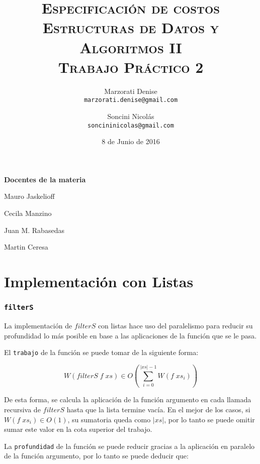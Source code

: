 \documentclass[a4paper,10pt]{article}
\author{
    Marzorati Denise \\
    \texttt{marzorati.denise@gmail.com}
    \and Soncini Nicolás \\
    \texttt{soncininicolas@gmail.com}
}
\date{
    8 de Junio de 2016
}
\title{
    \Huge \textsc{Especificación de costos} \\
    \large \textsc{Estructuras de Datos y Algoritmos II} \\
    \textsc{Trabajo Práctico 2}
}
\begin{document}
\bigskip
\bigskip
\bigskip

\maketitle

\thispagestyle{empty}

\begin{center}
\large \bf Docentes de la materia
\end{center}

\begin{center}
Mauro Jaskelioff

Cecila Manzino

Juan M. Rabasedas

Martin Ceresa
\end{center}

\newpage{}


\part*{Implementación con Listas}


\section*{\texttt{filterS}}

    La implementación de $filterS$ con listas hace uso del paralelismo para
reducir su profundidad lo más posible en base a las aplicaciones de la función 
que se le pasa.

    El \texttt{trabajo} de la función se puede tomar de la siguiente forma:

\begin{equation*}
    W \left(filterS\; f \;xs\right) \in
    O \left( \sum_{i=0}^{\vert xs \vert -1} W \left( f\; xs_i \right) \right)
\end{equation*}

De esta forma, se calcula la aplicación de la función argumento en cada
llamada recursiva de $filterS$ hasta que la lista termine vacía.
En el mejor de los casos, si $W \left( f\; xs_i \right) \in O \left( 1 \right)$,
su sumatoria queda como $\vert xs \vert$, por lo tanto se puede omitir sumar este valor
en la cota superior del trabajo.

\bigskip

La \texttt{profundidad} de la función se puede reducir gracias a la aplicación
en paralelo de la función argumento, por lo tanto se puede deducir que:
\end{document}

